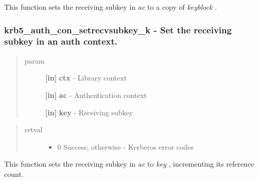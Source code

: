 \documentclass[letterpaper,10pt,english]{sphinxmanual}
\begin{document}
This function sets the receiving subkey in \emph{ac} to a copy of \emph{keyblock} .


\subsubsection{krb5\_auth\_con\_setrecvsubkey\_k -  Set the receiving subkey in an auth context.}
\label{appdev/refs/api/krb5_auth_con_setrecvsubkey_k::doc}\label{appdev/refs/api/krb5_auth_con_setrecvsubkey_k:krb5-auth-con-setrecvsubkey-k-set-the-receiving-subkey-in-an-auth-context}

\begin{fulllineitems}
\label{appdev/refs/api/krb5_auth_con_setrecvsubkey_k:c.krb5_auth_con_setrecvsubkey_k}
\end{fulllineitems}

\begin{quote}\begin{description}
\item[{param}] \leavevmode
\textbf{{[}in{]}} \textbf{ctx} - Library context

\textbf{{[}in{]}} \textbf{ac} - Authentication context

\textbf{{[}in{]}} \textbf{key} - Receiving subkey

\end{description}\end{quote}
\begin{quote}\begin{description}
\item[{retval}] \leavevmode\begin{itemize}
\item {} 
0   Success; otherwise - Kerberos error codes

\end{itemize}

\end{description}\end{quote}

This function sets the receiving subkey in \emph{ac} to \emph{key} , incrementing its reference count.
\end{document}
